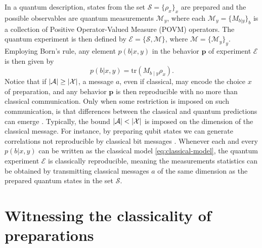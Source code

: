 \documentclass[a4paper,preprintnumbers,floatfix,superscriptaddress,pra,twocolumn,showpacs,notitlepage,longbibliography]{revtex4-2}
\begin{document}
    In a quantum description, states from the set $\mathcal{S} = \{\rho_x \}_x$ are prepared and the possible observables are quantum measurements $\mathcal{M}_y$, where each $\mathcal{M}_y = \{ M_{b \vert y} \}_{b}$ is a collection of Positive Operator-Valued Measure (POVM) operators. The quantum experiment is then defined by $\mathcal{E} = \{ \mathcal{S}, \mathcal{M} \} $, where $ \mathcal{M} = \{ \mathcal{M}_y \}_y $. Employing Born's rule, any element $p(b \vert x, y)$ in the behavior $\bm{p}$ of experiment $\mathcal{E}$ is then given by
    \begin{equation}
        p(b \vert x, y) = \text{tr}\left( M_{b \mid y} \rho_x \right) .
    \end{equation}
    Notice that if $\abs{\mathcal{A}} \geq \abs{\mathcal{X}}$, a message $a$, even if classical, may encode the choice $x$ of preparation, and any behavior $\bm{p}$ is then reproducible with no more than classical communication. Only when some restriction is imposed on such communication, is that differences between the classical and quantum predictions can emerge \cite{gallego-pam-2010,bowles2014certifying,chaves2015device,van2017semi,tavakoli2020informationally,Poderini2020}. Typically, the bound $\abs{\mathcal{A}} < \abs{\mathcal{X}}$ is imposed on the dimension of the classical message. For instance, by preparing qubit states we can generate correlations not reproducible by classical bit messages \cite{gallego-pam-2010}. Whenever each and every $p(b \vert x, y)$ can be written as the classical model \eqref{eq:classical-model}, the quantum experiment $\mathcal{E}$ is classically reproducible, meaning the measurements statistics can be obtained by transmitting classical messages $a$ of the same dimension as the prepared quantum states in the set $\mathcal{S}$.




\section{Witnessing the classicality of preparations} 
\end{document}
